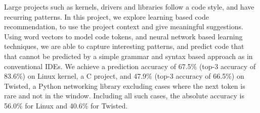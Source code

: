 Large projects such as kernels, drivers and libraries follow a code
style, and have recurring patterns. In this project, we explore learning based
code recommendation, to use the project context and give meaningful
suggestions.
Using word vectors to model code tokens, and neural network based learning
techniques, we are able to capture interesting patterns, and predict code that
that cannot be predicted by a simple grammar and syntax based approach as in
conventional IDEs.
We achieve a prediction accuracy of 67.5\% (top-3 accuracy of 83.6\%) on Linux
kernel, a C project, and 47.9\% (top-3 accuracy of 66.5\%) on Twisted, a Python
networking library excluding cases where the next token is rare and not in the
window. Including all such cases, the absolute accuracy is 56.0\% for
Linux and 40.6\% for Twisted.
